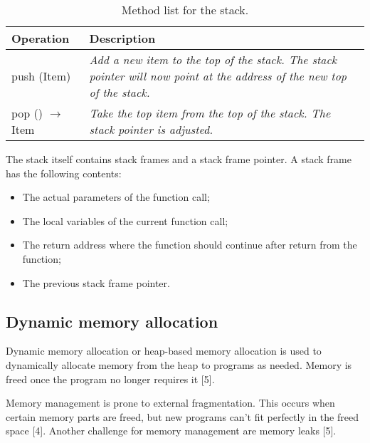 \begin{table}
	\caption{Method list for the stack.}
	\label{tab:api:groupcommunication}
	\begin{tabular}{p{150px} | p{250px}}
		\textbf{Operation} & \textbf{Description} \\
		\hline
		push (Item) 						& \emph{Add a new item to the top of the stack. The stack pointer will now point at the address of the new top of the stack.} \\
		pop () $\rightarrow$ Item & \emph{Take the top item from the top of the stack. The stack pointer is adjusted.} \\
		\hline
	\end{tabular}
\end{table}


The stack itself contains stack frames and a stack frame pointer. A stack frame has the following contents:
\begin{itemize}
	\item The actual parameters of the function call;
	\item The local variables of the current function call;
	\item The return address where the function should continue after return from the function;
	\item The previous stack frame pointer.
\end{itemize}



\subsection{Dynamic memory allocation}

Dynamic memory allocation or heap-based memory allocation is used to dynamically allocate memory from the heap to programs as needed. Memory is freed once the program no longer requires it [5].

Memory management is prone to external fragmentation. This occurs when certain memory parts are freed, but new programs can't fit perfectly in the freed space [4]. Another challenge for memory management are memory leaks [5].
